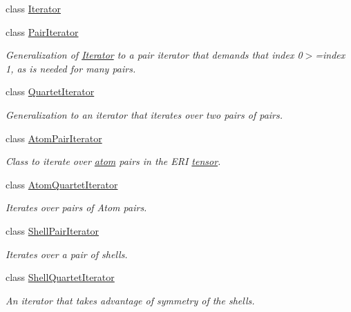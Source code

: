 \begin{DoxyCompactItemize}
class \hyperlink{classJKBuilder_1_1Iterator}{Iterator}
\item 
class \hyperlink{classJKBuilder_1_1PairIterator}{PairIterator}
\begin{DoxyCompactList}\small\item\em Generalization of \hyperlink{classJKBuilder_1_1Iterator}{Iterator} to a pair iterator that demands that index 0$>$=index 1, as is needed for many pairs. \item\end{DoxyCompactList}\item 
class \hyperlink{classJKBuilder_1_1QuartetIterator}{QuartetIterator}
\begin{DoxyCompactList}\small\item\em Generalization to an iterator that iterates over two pairs of pairs. \item\end{DoxyCompactList}\item 
class \hyperlink{classJKBuilder_1_1AtomPairIterator}{AtomPairIterator}
\begin{DoxyCompactList}\small\item\em Class to iterate over \hyperlink{classJKBuilder_1_1atom}{atom} pairs in the ERI \hyperlink{classJKBuilder_1_1tensor}{tensor}. \item\end{DoxyCompactList}\item 
class \hyperlink{classJKBuilder_1_1AtomQuartetIterator}{AtomQuartetIterator}
\begin{DoxyCompactList}\small\item\em Iterates over pairs of Atom pairs. \item\end{DoxyCompactList}\item 
class \hyperlink{classJKBuilder_1_1ShellPairIterator}{ShellPairIterator}
\begin{DoxyCompactList}\small\item\em Iterates over a pair of shells. \item\end{DoxyCompactList}\item 
class \hyperlink{classJKBuilder_1_1ShellQuartetIterator}{ShellQuartetIterator}
\begin{DoxyCompactList}\small\item\em An iterator that takes advantage of symmetry of the shells. \item\end{DoxyCompactList}\item 

\end{DoxyCompactItemize}
